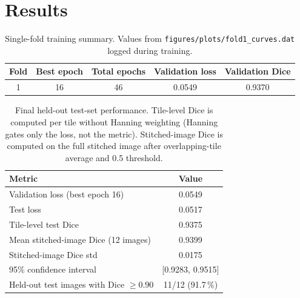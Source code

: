\documentclass[11pt,letterpaper]{article}
\begin{document}
\section{Results}
\begin{table}[htbp]
\centering
\caption{Single-fold training summary. Values from \texttt{figures/plots/fold1\_curves.dat} logged during training.}
\begin{tabular}{ccccc}
\toprule
Fold & Best epoch & Total epochs & Validation loss & Validation Dice \\
\midrule
1 & 16 & 46 & 0.0549 & 0.9370 \\
\bottomrule
\end{tabular}
\label{tab:fold-results}
\end{table}
\begin{table}[htbp]
\centering
\caption{Final held-out test-set performance. Tile-level Dice is computed per tile without Hanning weighting (Hanning gates only the loss, not the metric). Stitched-image Dice is computed on the full stitched image after overlapping-tile average and 0.5 threshold.}
\begin{tabular}{lc}
\toprule
Metric & Value \\
\midrule
Validation loss (best epoch 16) & 0.0549 \\
Test loss & 0.0517 \\
Tile-level test Dice & 0.9375 \\
Mean stitched-image Dice (12 images) & 0.9399 \\
Stitched-image Dice std & 0.0175 \\
95\% confidence interval & [0.9283, 0.9515] \\
Held-out test images with Dice $\ge 0.90$ & 11/12 (91.7\,\%) \\
\bottomrule
\end{tabular}
\label{tab:test-results}
\end{table}
\end{document}
